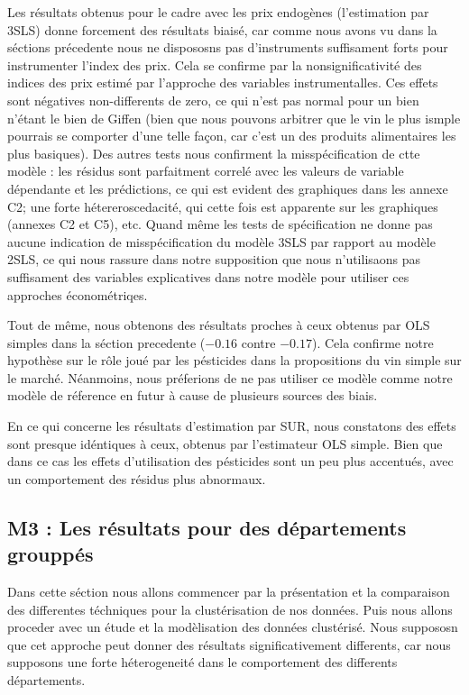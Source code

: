 \documentclass[11pt,]{article}
\begin{document}
Les résultats obtenus pour le cadre avec les prix endogènes
(l'estimation par 3SLS) donne forcement des résultats biaisé, car comme
nous avons vu dans la séctions précedente nous ne dispososns pas
d'instruments suffisament forts pour instrumenter l'index des prix. Cela
se confirme par la nonsignificativité des indices des prix estimé par
l'approche des variables instrumentalles. Ces effets sont négatives
non-differents de zero, ce qui n'est pas normal pour un bien n'étant le
bien de Giffen (bien que nous pouvons arbitrer que le vin le plus ismple
pourrais se comporter d'une telle façon, car c'est un des produits
alimentaires les plus basiques). Des autres tests nous confirment la
misspécification de ctte modèle : les résidus sont parfaitment correlé
avec les valeurs de variable dépendante et les prédictions, ce qui est
evident des graphiques dans les annexe C2; une forte hétereroscedacité,
qui cette fois est apparente sur les graphiques (annexes C2 et C5), etc.
Quand même les tests de spécification ne donne pas aucune indication de
misspécification du modèle 3SLS par rapport au modèle 2SLS, ce qui nous
rassure dans notre supposition que nous n'utilisaons pas suffisament des
variables explicatives dans notre modèle pour utiliser ces approches
économétriqes.

Tout de même, nous obtenons des résultats proches à ceux obtenus par OLS
simples dans la séction precedente (\(-0.16\) contre \(-0.17\)). Cela
confirme notre hypothèse sur le rôle joué par les pésticides dans la
propositions du vin simple sur le marché. Néanmoins, nous préferions de
ne pas utiliser ce modèle comme notre modèle de réference en futur à
cause de plusieurs sources des biais.

En ce qui concerne les résultats d'estimation par SUR, nous constatons
des effets sont presque idéntiques à ceux, obtenus par l'estimateur OLS
simple. Bien que dans ce cas les effets d'utilisation des pésticides
sont un peu plus accentués, avec un comportement des résidus plus
abnormaux.

\hypertarget{m3-les-resultats-pour-des-departements-grouppes}{%
\subsection{M3 : Les résultats pour des départements
grouppés}\label{m3-les-resultats-pour-des-departements-grouppes}}

Dans cette séction nous allons commencer par la présentation et la
comparaison des differentes téchniques pour la clustérisation de nos
données. Puis nous allons proceder avec un étude et la modèlisation des
données clustérisé. Nous suppososn que cet approche peut donner des
résultats significativement differents, car nous supposons une forte
héterogeneité dans le comportement des differents départements.
\end{document}
